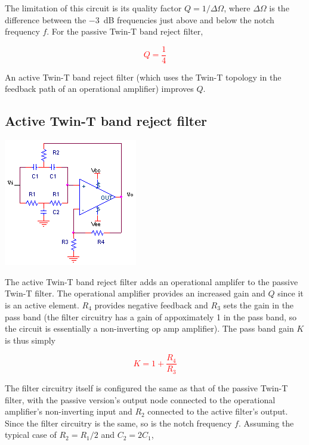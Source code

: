 The limitation of this circuit is its quality factor $Q = 1/\Delta\Omega$, where $\Delta\Omega$ is the difference between the \SI{-3}{\dB} frequencies just above and below the notch frequency $f$.
For the passive Twin-T band reject filter,

\textcolor{red}{
\begin{equation}
Q = \frac{1}{4}
\label{passiveTwinT_Q}
\end{equation}
}

An active Twin-T band reject filter (which uses the Twin-T topology in the feedback path of an operational amplifier) improves $Q$. \autocite[321]{op-amps-for-everyone}

\subsection{Active Twin-T band reject filter}
\begin{center}
	\includegraphics{schematics/activeTwinTbandrejectfilter.PNG}
\end{center}
The active Twin-T band reject filter adds an operational amplifer to the passive Twin-T filter.
The operational amplifier provides an increased gain and $Q$ since it is an active element.
$R_4$ provides negative feedback and $R_3$ sets the gain in the pass band (the filter circuitry has a gain of appoximately 1 in the pass band, so the circuit is essentially a non-inverting op amp amplifier).
The pass band gain $K$ is thus simply

\textcolor{red}{
\begin{equation}
K = 1 + \frac{R_{4}}{R_{3}}
\end{equation}
}

The filter circuitry itself is configured the same as that of the passive Twin-T filter, with the passive version's output node connected to the operational amplifier's non-inverting input and $R_2$ connected to the active filter's output.
Since the filter circuitry is the same, so is the notch frequency $f$.
Assuming the typical case of $R_2 = R_1/2$ and $C_2 = 2C_1$,

